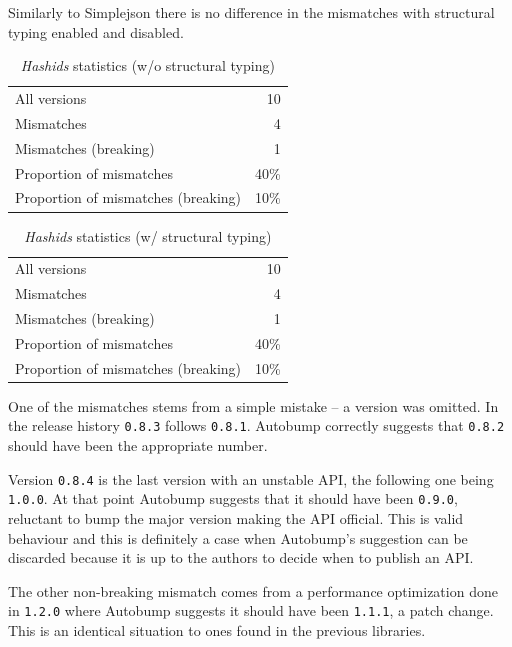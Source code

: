 \documentclass{l4proj}
\newcommand\genericstyle{\lstset{basicstyle=\ttm}}
\newcommand\codeinline[1]{{\genericstyle\lstinline!#1!}}
\begin{document}
Similarly to Simplejson there is no difference in the
mismatches with structural typing enabled and disabled.

\noindent
\begin{minipage}[t]{0.5\textwidth}
\begin{table}[H]
\centering
\begin{tabular}{|lr|}
All versions & 10 \\
Mismatches & 4 \\
Mismatches (breaking) & 1 \\
Proportion of mismatches & 40\% \\
Proportion of mismatches (breaking) & 10\% \\
\end{tabular}
\caption{\textit{Hashids} statistics (w/o structural typing)}
\label{HashidsNonStructural}
\end{table}
\end{minipage}
\begin{minipage}[t]{0.5\textwidth}
\begin{table}[H]
\centering
\begin{tabular}{|lr|}
All versions & 10 \\
Mismatches & 4 \\
Mismatches (breaking) & 1 \\
Proportion of mismatches & 40\% \\
Proportion of mismatches (breaking) & 10\% \\
\end{tabular}
\caption{\textit{Hashids} statistics (w/ structural typing)}
\label{HashidsStructural}
\end{table}
\end{minipage}

One of the mismatches stems from a simple mistake -- a version was
omitted. In the release history \codeinline{0.8.3} follows
\codeinline{0.8.1}. Autobump correctly suggests that
\codeinline{0.8.2} should have been the appropriate number.

Version \codeinline{0.8.4} is the last version with an unstable API,
the following one being \codeinline{1.0.0}. At that point Autobump
suggests that it should have been \codeinline{0.9.0}, reluctant to
bump the major version making the API official. This is valid
behaviour and this is definitely a case when Autobump's suggestion can
be discarded because it is up to the authors to decide when to publish
an API.

The other non-breaking mismatch comes from a performance optimization
done in \codeinline{1.2.0} where Autobump suggests it should have been
\codeinline{1.1.1}, a patch change. This is an identical situation to
ones found in the previous libraries.
\end{document}
